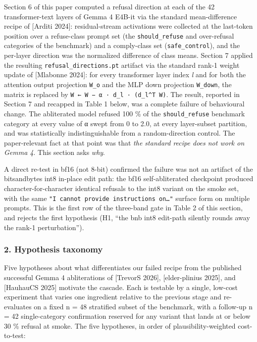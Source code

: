\documentclass[
  11pt,
]{article}
\begin{document}
Section 6 of this paper computed a refusal direction at each of the 42
transformer-text layers of Gemma 4 E4B-it via the standard
mean-difference recipe of {[}Arditi 2024{]}: residual-stream activations
were collected at the last-token position over a refuse-class prompt set
(the \texttt{should\_refuse} and over-refusal categories of the
benchmark) and a comply-class set (\texttt{safe\_control}), and the
per-layer direction was the normalized difference of class means.
Section 7 applied the resulting \texttt{refusal\_directions.pt} artifact
via the standard rank-1 weight update of {[}Mlabonne 2024{]}: for every
transformer layer index \emph{l} and for both the attention output
projection \texttt{W\_o} and the MLP down projection \texttt{W\_down},
the matrix is replaced by
\texttt{W\textquotesingle{}\ ←\ W\ −\ α\ ·\ d\_l\ ·\ (d\_l\^{}T\ W)}.
The result, reported in Section 7 and recapped in Table 1 below, was a
complete failure of behavioural change. The abliterated model refused
100 \% of the \texttt{should\_refuse} benchmark category at every value
of α swept from 0 to 2.0, at every layer-subset partition, and was
statistically indistinguishable from a random-direction control. The
paper-relevant fact at that point was that \emph{the standard recipe
does not work on Gemma 4}. This section asks \emph{why}.

A direct re-test in bf16 (not 8-bit) confirmed the failure was not an
artifact of the bitsandbytes int8 in-place edit path: the bf16
self-abliterated checkpoint produced character-for-character identical
refusals to the int8 variant on the smoke set, with the same
\texttt{"I\ cannot\ provide\ instructions\ on…"} surface form on
multiple prompts. This is the first row of the three-band gate in Table
2 of this section, and rejects the first hypothesis (H1, ``the bnb int8
edit-path silently rounds away the rank-1 perturbation'').

\subsubsection{2. Hypothesis taxonomy}\label{hypothesis-taxonomy}

Five hypotheses about what differentiates our failed recipe from the
published successful Gemma 4 abliterations of {[}TrevorS 2026{]},
{[}elder-plinius 2025{]}, and {[}HauhauCS 2025{]} motivate the cascade.
Each is testable by a single, low-cost experiment that varies one
ingredient relative to the previous stage and re-evaluates on a fixed n
= 48 stratified subset of the benchmark, with a follow-up n = 42
single-category confirmation reserved for any variant that lands at or
below 30 \% refusal at smoke. The five hypotheses, in order of
plausibility-weighted cost-to-test:
\end{document}
